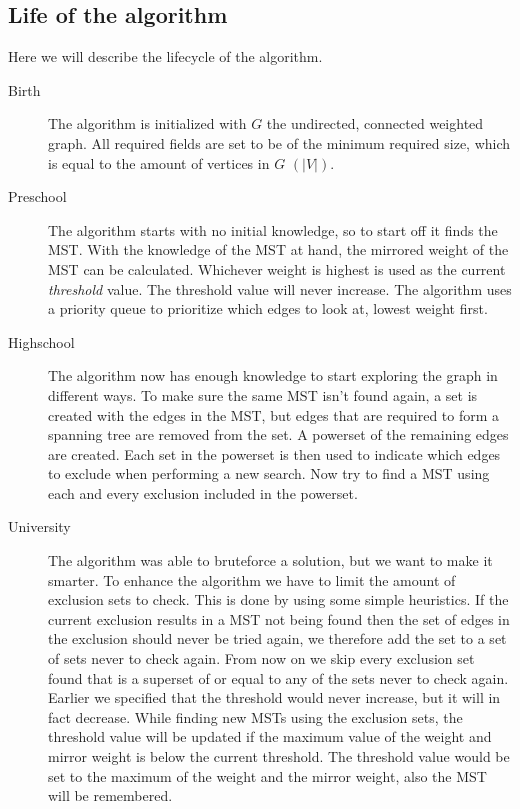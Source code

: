 \documentclass[12pt]{report}
\begin{document}
\subsection{Life of the algorithm}
Here we will describe the lifecycle of the algorithm.
\begin{description}
	\item[Birth] The algorithm is initialized with $G$ the undirected, connected weighted graph. All required fields are set to be of the minimum required size, which is equal to the amount of vertices in $G$ $(|V|)$.
	
	\item[Preschool] The algorithm starts with no initial knowledge, so to start off it finds the MST. With the knowledge of the MST at hand, the mirrored weight of the MST can be calculated. Whichever weight is highest is used as the current \emph{threshold} value. The threshold value will never increase. The algorithm uses a priority queue to prioritize which edges to look at, lowest weight first.
	
	\item[Highschool] The algorithm now has enough knowledge to start exploring the graph in different ways. To make sure the same MST isn't found again, a set is created with the edges in the MST, but edges that are required to form a spanning tree are removed from the set. A powerset of the remaining edges are created. Each set in the powerset is then used to indicate which edges to exclude when performing a new search. Now try to find a MST using each and every exclusion included in the powerset.
	
	\item[University] The algorithm was able to bruteforce a solution, but we want to make it smarter. To enhance the algorithm we have to limit the amount of exclusion sets to check. This is done by using some simple heuristics. If the current exclusion results in a MST not being found then the set of edges in the exclusion should never be tried again, we therefore add the set to a set of sets never to check again. From now on we skip every exclusion set found that is a superset of or equal to any of the sets never to check again. Earlier we specified that the threshold would never increase, but it will in fact decrease. While finding new MSTs using the exclusion sets, the threshold value will be updated if the maximum value of the weight and mirror weight is below the current threshold. The threshold value would be set to the maximum of the weight and the mirror weight, also the MST will be remembered.
	

\end{description}
\end{document}
